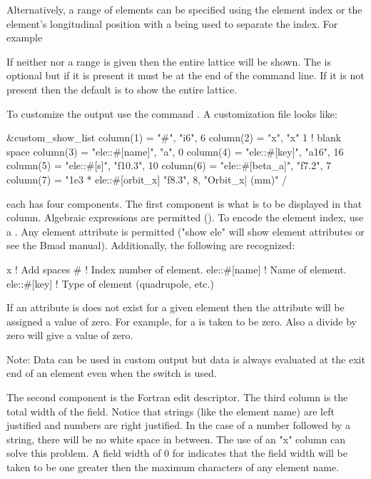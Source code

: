 {{{\begin{description}
Alternatively, a range of elements can be specified using the element
index or the element's longitudinal position with a  being
used to separate the index. For example
If neither  nor a range is given then the entire lattice
will be shown. The  is optional but if it is present
it must be at the end of the command line.  If it is not present then
the default is to show the entire lattice.

To customize the output use the command . A customization file looks like:
\begin{example}
  &custom_show_list
    column(1) = "#",                     "i6",     6 
    column(2) = "x",                     "x"       1       ! blank space
    column(3) = "ele::#[name]",          "a",      0
    column(4) = "ele::#[key]",           "a16",   16
    column(5) = "ele::#[s]",             "f10.3", 10
    column(6) = "ele::#[beta_a]",        "f7.2",   7
    column(7) = "1e3 * ele::#[orbit_x]   "f8.3",   8, "Orbit_x| (mm)" 
  /
\end{example}
each  has four components. The first component is what
is to be displayed in that column. Algebraic expressions are
permitted (). To encode the element index, use a \vn{#}.
Any element attribute is permitted ("show ele" will show
element attributes or see the Bmad manual). Additionally, the following
are recognized:
\begin{example}
  x                           ! Add spaces
  #                           ! Index number of element.
  ele::#[name]                ! Name of element.
  ele::#[key]                 ! Type of element (quadrupole, etc.)
\end{example}
If an attribute is does not exist for a given element then the
attribute will be assigned a value of zero. For example, 
for a  is taken to be zero. Also a divide by zero will
give a value of zero.

Note: Data can be used in custom output but data is always evaluated at
the exit end of an element even when the  switch is used.

The second component is the Fortran edit descriptor. The third column
is the total width of the field. Notice that strings (like the element
name) are left justified and numbers are right justified. In the case
of a number followed by a string, there will be no white space in
between. The use of an "x" column can solve this problem. A field width
of 0 for  indicates that the field width will be taken to be
one greater then the maximum characters of any element name.


\end{description}}}}
